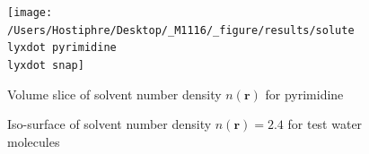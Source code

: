 \begin{figure}
\begin{centering}
\texttt{[image: /Users/Hostiphre/Desktop/\_M1116/\_figure/results/solute\\lyxdot pyrimidine\\lyxdot snap]}
\par\end{centering}
\caption{Volume slice of solvent number density $n(\mathbf{r})$ for pyrimidine\label{fig:Volume-slice-of}}
\end{figure}

\begin{figure}

\caption{Iso-surface of solvent number density $n(\mathbf{r})=2.4$ for test
water molecules\label{fig:Iso-surface-of-solvent}}
\end{figure}

\newpage{}

$ $
